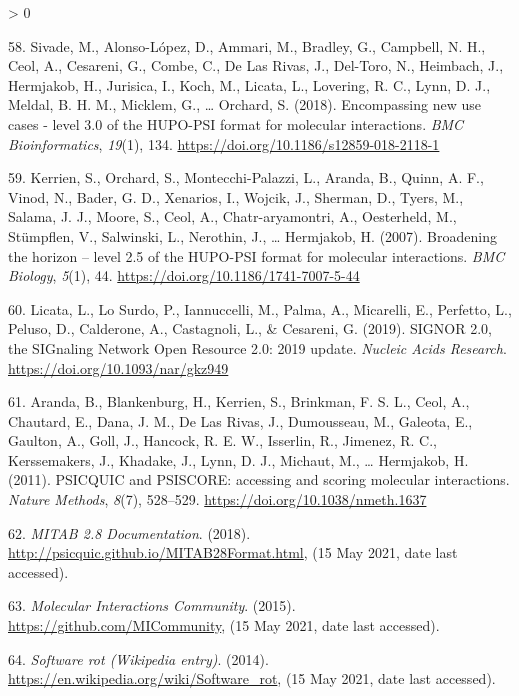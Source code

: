 \documentclass[
  12pt,
]{book}
\newlength{\cslhangindent}
\newenvironment{CSLReferences}[2] %
 {%
  \setlength{\parindent}{0pt}
  \ifodd #1 \everypar{\setlength{\hangindent}{\cslhangindent}}\ignorespaces\fi
  \ifnum #2 > 0
  \setlength{\parskip}{#2\baselineskip}
  \fi
 }%
 {}
\begin{document}
\begin{CSLReferences}{1}{0}
\leavevmode\hypertarget{ref-Sivade2018}{}%
58. Sivade, M., Alonso-López, D., Ammari, M., Bradley, G., Campbell, N. H., Ceol, A., Cesareni, G., Combe, C., De Las Rivas, J., Del-Toro, N., Heimbach, J., Hermjakob, H., Jurisica, I., Koch, M., Licata, L., Lovering, R. C., Lynn, D. J., Meldal, B. H. M., Micklem, G., \ldots{} Orchard, S. (2018). {Encompassing new use cases - level 3.0 of the HUPO-PSI format for molecular interactions}. \emph{BMC Bioinformatics}, \emph{19}(1), 134. \url{https://doi.org/10.1186/s12859-018-2118-1}

\leavevmode\hypertarget{ref-Kerrien2007}{}%
59. Kerrien, S., Orchard, S., Montecchi-Palazzi, L., Aranda, B., Quinn, A. F., Vinod, N., Bader, G. D., Xenarios, I., Wojcik, J., Sherman, D., Tyers, M., Salama, J. J., Moore, S., Ceol, A., Chatr-aryamontri, A., Oesterheld, M., Stümpflen, V., Salwinski, L., Nerothin, J., \ldots{} Hermjakob, H. (2007). {Broadening the horizon -- level 2.5 of the HUPO-PSI format for molecular interactions}. \emph{BMC Biology}, \emph{5}(1), 44. \url{https://doi.org/10.1186/1741-7007-5-44}

\leavevmode\hypertarget{ref-Licata2019}{}%
60. Licata, L., Lo Surdo, P., Iannuccelli, M., Palma, A., Micarelli, E., Perfetto, L., Peluso, D., Calderone, A., Castagnoli, L., \& Cesareni, G. (2019). {SIGNOR 2.0, the SIGnaling Network Open Resource 2.0: 2019 update}. \emph{Nucleic Acids Research}. \url{https://doi.org/10.1093/nar/gkz949}

\leavevmode\hypertarget{ref-Aranda2011}{}%
61. Aranda, B., Blankenburg, H., Kerrien, S., Brinkman, F. S. L., Ceol, A., Chautard, E., Dana, J. M., De Las Rivas, J., Dumousseau, M., Galeota, E., Gaulton, A., Goll, J., Hancock, R. E. W., Isserlin, R., Jimenez, R. C., Kerssemakers, J., Khadake, J., Lynn, D. J., Michaut, M., \ldots{} Hermjakob, H. (2011). {PSICQUIC and PSISCORE: accessing and scoring molecular interactions}. \emph{Nature Methods}, \emph{8}(7), 528--529. \url{https://doi.org/10.1038/nmeth.1637}

\leavevmode\hypertarget{ref-mitab28-doc}{}%
62. \emph{{MITAB 2.8 Documentation}}. (2018). \url{http://psicquic.github.io/MITAB28Format.html}, (15 May 2021, date last accessed).

\leavevmode\hypertarget{ref-mi-github}{}%
63. \emph{{Molecular Interactions Community}}. (2015). \url{https://github.com/MICommunity}, (15 May 2021, date last accessed).

\leavevmode\hypertarget{ref-wiki-soft-rot}{}%
64. \emph{{Software rot (Wikipedia entry)}}. (2014). \url{https://en.wikipedia.org/wiki/Software_rot}, (15 May 2021, date last accessed).


\end{CSLReferences}
\end{document}
